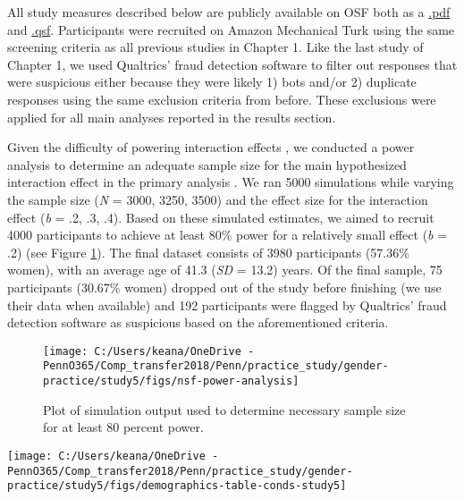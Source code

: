 \documentclass[letterpaper, nobind]{templates/ociamthesis}
\begin{document}
All study measures described below are publicly available on OSF both as a \href{https://osf.io/xbrvs/}{.pdf} and \href{https://osf.io/4mvyr/}{.qsf}. Participants were recruited on Amazon Mechanical Turk using the same screening criteria as all previous studies in Chapter 1. Like the last study of Chapter 1, we used Qualtrics' fraud detection software to filter out responses that were suspicious either because they were likely 1) bots and/or 2) duplicate responses using the same exclusion criteria from before. These exclusions were applied for all main analyses reported in the results section.

Given the difficulty of powering interaction effects \autocites[see][]{Simonsohn2014,Giner-Sorolla2018}, we conducted a power analysis to determine an adequate sample size for the main hypothesized interaction effect in the primary analysis \autocite[simulations modeled after code from][]{Hughes2017a}. We ran 5000 simulations while varying the sample size (\emph{N} = 3000, 3250, 3500) and the effect size for the interaction effect (\emph{b} = .2, .3, .4). Based on these simulated estimates, we aimed to recruit 4000 participants to achieve at least 80\% power for a relatively small effect (\emph{b} = .2) (see Figure \ref{fig:power-analysis-study5}). The final dataset consists of 3980 participants (57.36\% women), with an average age of 41.3 (\emph{SD} = 13.2) years. Of the final sample, 75 participants (30.67\% women) dropped out of the study before finishing (we use their data when available) and 192 participants were flagged by Qualtrics' fraud detection software as suspicious based on the aforementioned criteria.

\begin{figure}

{\centering \texttt{[image: C:/Users/keana/OneDrive - PennO365/Comp\_transfer2018/Penn/practice\_study/gender-practice/study5/figs/nsf-power-analysis]} 

}

\caption{Plot of simulation output used to determine necessary sample size for at least 80 percent power.}\label{fig:power-analysis-study5}
\end{figure}

\begin{center}\texttt{[image: C:/Users/keana/OneDrive - PennO365/Comp\_transfer2018/Penn/practice\_study/gender-practice/study5/figs/demographics-table-conds-study5]} \end{center}
\end{document}
